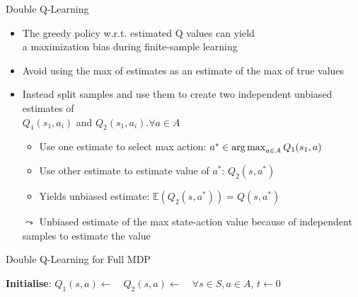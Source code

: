\documentclass[aspectratio=169]{../latex_main/tntbeamer}  %
\begin{document}
\begin{frame}[c]{Double Q-Learning}	
	
	\begin{itemize}
		\item The greedy policy w.r.t. estimated Q values can yield\\ a maximization bias during finite-sample learning
		\item Avoid using the max of estimates as an estimate of the max of true values
		\item Instead split samples and use them to create two independent unbiased
		estimates of\\ $Q_1(s_1, a_i)$ and $Q_2(s_1, a_i). \forall a\in A$
		\begin{itemize}
			\item Use one estimate to select max action: $a^* \in \operatorname*{arg\,max}_{a \in A} Q_1(s_1, a)$
			\item Use other estimate to estimate value of $a^*$: $Q_2(s,a^*)$
			\item Yields unbiased estimate: $\mathbb{E}(Q_2(s,a^*)) = Q(s,a^*)$
		\end{itemize}
		\item[$\leadsto$] Unbiased estimate of the max state-action value because of independent samples to estimate the value
	\end{itemize}

	
\end{frame}
\begin{frame}[c]{Double Q-Learning for Full MDP}	
	
	\begin{algorithm}[H]
        \caption{Double Q-Learning}
        \DontPrintSemicolon
        \LinesNotNumbered
        
        \textbf{Initialise}: $Q_{1}(s,a) \leftarrow \quad  Q_{2}(s,a) \leftarrow\quad \forall s \in S, a \in A$, $t \gets 0$
    
    \end{algorithm}
	
	
\end{frame}
\end{document}

